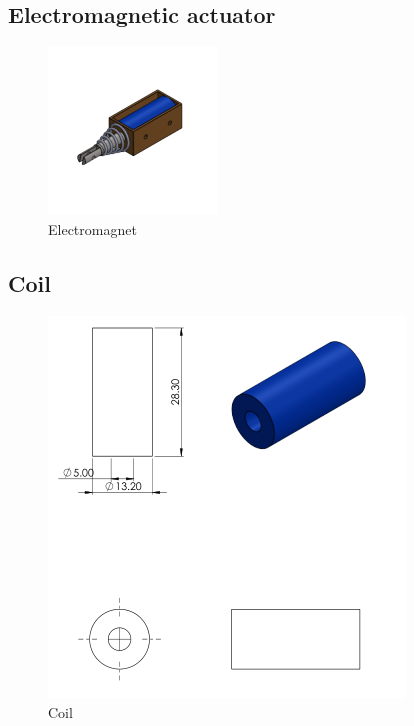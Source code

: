 \subsection{Electromagnetic actuator}
\begin{figure}[H]
    \centering
    \includegraphics{Figures/electromagnets.PNG}
    \caption{Electromagnet}
\end{figure}

\subsection{Coil}
\begin{figure}[H]
    \centering
    \includegraphics{Figures/Coil.PNG}
    \caption{Coil}
\end{figure}

